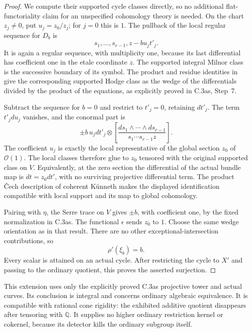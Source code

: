 \begin{proof}
We compute their supported cycle classes directly, so no additional
flat-functoriality claim for an unspecified cohomology theory is
needed. On the chart $z_j\ne0$, put $u_j=z_0/z_j$; for $j=0$
this is $1$. The pullback of the local regular sequence for $D_b$
is
\[
                  s_1,\ldots,s_{r-1},z-bu_jt'_j.
\]
It is again a regular sequence, with multiplicity one, because its
last differential has coefficient one in the etale coordinate $z$.
The supported integral Milnor class is the successive boundary
of its symbol. The product and residue identities in
\citet[Sections~3--4, especially equation~(24)]{cyBraunling2013}
give the corresponding supported Hodge class as the wedge of the
differentials divided by the product of the equations, as explicitly
proved in C.3as, Step~7.

Subtract the sequence for $b=0$ and restrict to $t'_j=0$, retaining
$dt'_j$. The term $t'_jdu_j$ vanishes, and the conormal part is
\[
 \pm b\,u_jdt'_j\otimes
       \left[\frac{ds_1\wedge\cdots\wedge ds_{r-1}}
                         {s_1\cdots s_{r-1}z}\right].
\]
The coefficient $u_j$ is exactly the local representative of the
global section $z_0$ of $\mathcal O(1)$. The local classes therefore
glue to $z_0$ tensored with the original supported class on $V$.
Equivalently, at the zero section the differential of the actual
bundle map is $dt=z_0dt'$, with no surviving projective differential
term. The product \v Cech description of coherent K\"unneth makes
the displayed identification compatible with local support and its
map to global cohomology.

Pairing with $\eta$, the Serre trace on $V$ gives $\pm b$, with
coefficient one, by the fixed normalization in C.3as. The functional
$\epsilon$ sends $z_0$ to $1$. Choose the same wedge orientation
as in that result. There are no other exceptional-intersection
contributions, so
\[
                              \rho'(\xi_b)=b.
\]
Every scalar is attained on an actual cycle. After restricting the
cycle to $X'$ and passing to the ordinary quotient, this proves the
asserted surjection.
\end{proof}

This extension uses only the explicitly proved C.3as projective
tower and actual curves. Its conclusion is integral and concerns
ordinary algebraic equivalence. It is compatible with rational
cone rigidity: the exhibited additive quotient disappears after
tensoring with $\mathbb Q$. It supplies no higher ordinary
restriction kernel or cokernel, because its detector kills the
ordinary subgroup itself.
